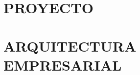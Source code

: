 \documentclass[a4paper,12pt]{report}
\begin{document}
    \maketitle
    \tableofcontents

    \part{PROYECTO}
    
    

    \part{ARQUITECTURA EMPRESARIAL}
    
    
    
    
    
    


    \printbibliography
\end{document}
